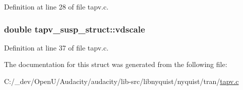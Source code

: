 Definition at line 28 of file tapv.\+c.

\subsubsection[{\texorpdfstring{vdscale}{vdscale}}]{\setlength{\rightskip}{0pt plus 5cm}double tapv\+\_\+susp\+\_\+struct\+::vdscale}\hypertarget{structtapv__susp__struct_a67a83b160d33ebe521f8065935962171}{}\label{structtapv__susp__struct_a67a83b160d33ebe521f8065935962171}


Definition at line 37 of file tapv.\+c.



The documentation for this struct was generated from the following file\+:\begin{DoxyCompactItemize}
\item 
C\+:/\+\_\+dev/\+Open\+U/\+Audacity/audacity/lib-\/src/libnyquist/nyquist/tran/\hyperlink{tapv_8c}{tapv.\+c}\end{DoxyCompactItemize}
